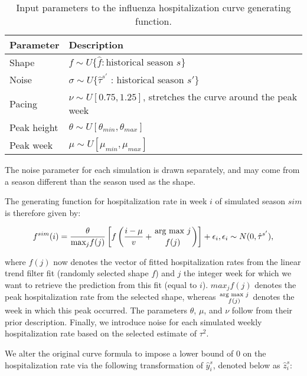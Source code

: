 \documentclass[10pt,letterpaper]{article}
\begin{document}
\begin{table}

\caption{\label{tab:sim-param-input-table}Input parameters to the influenza hospitalization curve generating function.}
\centering
\begin{threeparttable}
\begin{tabular}[t]{ll}
\toprule
Parameter & Description\\
\midrule
Shape & $f \sim U \{ \hat{f} : \text{historical season } s \}$\\
Noise & $\sigma \sim U \{\hat{\tau}^{s'} \text{ : historical season } s' \}$\\
Pacing & $\nu \sim U[0.75, 1.25]$, stretches the curve around the peak week\\
Peak height & $\theta \sim U\left[\theta_{min} , \theta_{max}\right]$\\
Peak week & $\mu \sim U[\mu_{min}, \mu_{max}]$\\
\bottomrule
\end{tabular}
\begin{tablenotes}
\item The noise parameter for each simulation is drawn separately, and may come from a season different than the season used as the shape.
\end{tablenotes}
\end{threeparttable}
\end{table}

The generating function for hospitalization rate in week \(i\) of
simulated season \(sim\) is therefore given by:

\[f^{sim} (i) = \frac{\theta}{\text{max}_j f(j)} \left[ f \left( \frac{i - \mu}{v} + \genfrac{}{}{0pt}{}{\text{arg max }{j}}{f(j)} \right) \right] + \epsilon_i, \epsilon_i \sim N(0, \hat{\tau}^{s'}),\]

where \(f(j)\) now denotes the vector of fitted hospitalization rates
from the linear trend filter fit (randomly selected shape \(f\)) and
\(j\) the integer week for which we want to retrieve the prediction from
this fit (equal to \(i\)). \(max_j f(j)\) denotes the peak
hospitalization rate from the selected shape, whereas
\(\genfrac{}{}{0pt}{}{\text{arg max } {j}}{f(j)}\) denotes the week in
which this peak occurred. The parameters \(\theta\), \(\mu\), and
\(\nu\) follow from their prior description. Finally, we introduce noise
for each simulated weekly hospitalization rate based on the selected
estimate of \(\tau^2\).

We alter the original curve formula to impose a lower bound of 0 on the
hospitalization rate via the following transformation of
\(\hat{y}^s_i\), denoted below as \(\hat{z}^s_i\):
\end{document}
